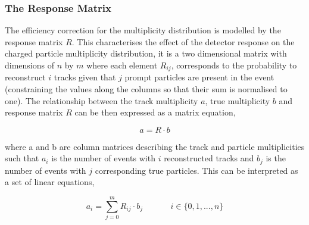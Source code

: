 \subsubsection{The Response Matrix}
\label{subsection: charged particle event multiplicity, the response matrix}

The efficiency correction for the multiplicity distribution is modelled by the response matrix $R$. This characterises the effect of the detector response on the charged particle multiplicity distribution, it is a two dimensional matrix with dimensions of $n$ by $m$ where each element $R_{ij}$, corresponds to the probability to reconstruct $i$ tracks given that $j$ prompt particles are present in the event (constraining the values along the columns so that their sum is normalised to one). The relationship between the track multiplicity $a$, true multiplicity $b$ and response matrix $R$ can be then expressed as a matrix equation,


\begin{equation}
	\label{equation: multiplicity-response relationship}
	a = R \cdot b
\end{equation}

where a and b are column matrices describing the track and particle multiplicities such that $a_i$ is the number of events with $i$ reconstructed tracks and $b_j$ is the number of events with $j$ corresponding true particles. This can be interpreted as a set of linear equations,

\begin{equation}
	a_i = \sum_{j=0}^m{R_{ij} \cdot b_j} \,\,\,\,\,\,\,\,\,\,\,\,\,\,\,\,\,\,\,\, i \in \{0, 1, ... , n\}
\end{equation}

%
%
%

